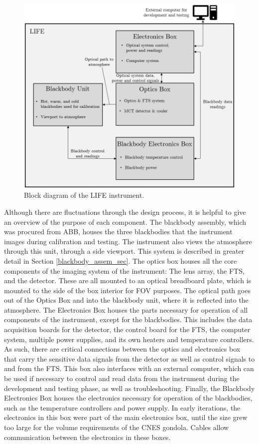 \begin{figure}
    \centering
    \includegraphics[width=\linewidth]{chap3_images/LIFE_block_diagram.JPG}
    \caption{Block diagram of the LIFE instrument.}
    \label{fig:LIFE_block_diagram}
\end{figure}

Although there are fluctuations through the design process, it is helpful to give an overview of the purpose of each component. The blackbody assembly, which was procured from ABB, houses the three blackbodies that the instrument images during calibration and testing. The instrument also views the atmosphere through this unit, through a side viewport. This system is described in greater detail in Section \ref{blackbody_assem_sec}. The optics box houses all the core components of the imaging system of the instrument: The lens array, the FTS, and the detector. These are all mounted to an optical breadboard plate, which is mounted to the side of the box interior for FOV purposes. The optical path goes out of the Optics Box and into the blackbody unit, where it is reflected into the atmosphere. The Electronics Box houses the parts necessary for operation of all components of the instrument, except for the blackbodies. This includes the data acquisition boards for the detector, the control board for the FTS, the computer system, multiple power supplies, and its own heaters and temperature controllers. As such, there are critical connections between the optics and electronics box that carry the sensitive data signals from the detector as well as control signals to and from the FTS. This box also interfaces with an external computer, which can be used if necessary to control and read data from the instrument during the development and testing phase, as well as troubleshooting. Finally, the Blackbody Electronics Box houses the electronics necessary for operation of the blackbodies, such as the temperature controllers and power supply. In early iterations, the electronics in this box were part of the main electronics box, until the size grew too large for the volume requirements of the CNES gondola. Cables allow communication between the electronics in these boxes.

